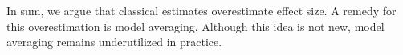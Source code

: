 \documentclass[a4paper]{article}
\newcommand{\DON}[1]{\todo[inline, color=white]{Don: #1}}
\newcommand{\J}[1]{\todo[inline, color=mypink]{#1}}
\begin{document}
In sum, we argue that classical estimates overestimate effect size. A remedy for this overestimation is model averaging. Although this idea is not new, model averaging remains underutilized in practice.









% 
\end{document}
